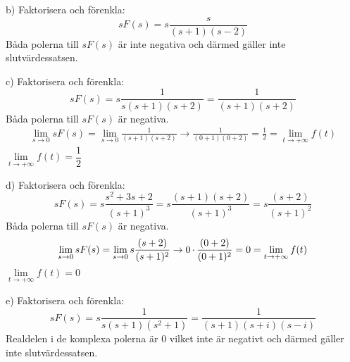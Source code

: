 \begin{task}{b)}
	Faktorisera och förenkla:
	\[sF(s)=
	s\frac{s}{(s+1)(s-2)}\]
	Båda polerna till $sF(s)$ är inte negativa och därmed gäller inte slutvärdessatsen.
\end{task}

\begin{task}{c)}
	Faktorisera och förenkla:
	\[sF(s)=
	s\frac{1}{s(s+1)(s+2)}=
	\frac{1}{(s+1)(s+2)}\]
	Båda polerna till $sF(s)$ är negativa.
	\begin{align*}
	\lim\limits_{s\rightarrow 0}sF(s)=
	\lim\limits_{s\rightarrow 0}\frac{1}{(s+1)(s+2)}\rightarrow
	\frac{1}{(0+1)(0+2)}=
	\frac{1}{2}=\lim\limits_{t\rightarrow +\infty}f(t)
	\end{align*}
	\ans $\lim\limits_{t\rightarrow +\infty}f(t)=\dfrac{1}{2}$
\end{task}

\begin{task}{d)}
	Faktorisera och förenkla:
	\[sF(s)=
	s\frac{s^2+3s+2}{(s+1)^3}=
	s\frac{(s+1)(s+2)}{(s+1)^3}=
	s\frac{(s+2)}{(s+1)^2}\]
	Båda polerna till $sF(s)$ är negativa.
	\begin{align*}
	\lim\limits_{s\rightarrow 0}sF(s)=
	\lim\limits_{s\rightarrow 0}s\frac{(s+2)}{(s+1)^2}\rightarrow
	0\operatorname{\cdot}\frac{(0+2)}{(0+1)^2}=
	0=\lim\limits_{t\rightarrow +\infty}f(t)
	\end{align*}
	\ans $\lim\limits_{t\rightarrow +\infty}f(t)=0$
\end{task}

\begin{task}{e)}
	Faktorisera och förenkla:
	\[sF(s)=
	s\frac{1}{s(s+1)(s^2+1)}=
	\frac{1}{(s+1)(s+i)(s-i)}\]
	Realdelen i de komplexa polerna är 0 vilket inte är negativt och därmed gäller inte slutvärdessatsen.
\end{task}